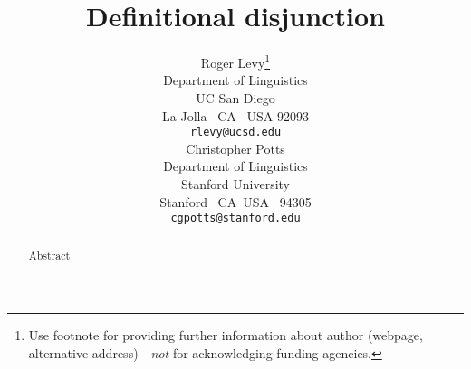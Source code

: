 \documentclass{article} %
\title{Definitional disjunction }
\author{
Roger Levy\thanks{Use footnote for providing further information
about author (webpage, alternative address)---\emph{not} for acknowledging
funding agencies.} \\
Department of Linguistics\\
UC San Diego\\
La Jolla \ CA \ USA 92093\\
\texttt{rlevy@ucsd.edu} \\
\And
Christopher Potts \\
Department of Linguistics\\
Stanford University\\
Stanford \ CA\  USA \ 94305\\
\texttt{cgpotts@stanford.edu}
}
\begin{document}
\maketitle

\begin{abstract}
  Abstract
\end{abstract}






\end{document}
